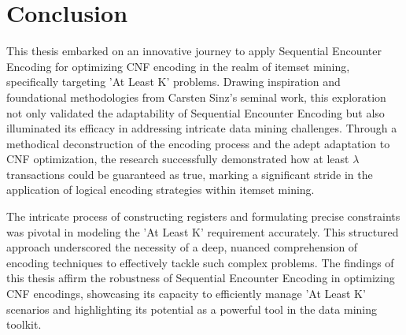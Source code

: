 \section{Conclusion}
This thesis embarked on an innovative journey to apply Sequential Encounter Encoding for optimizing CNF encoding in the realm of itemset mining, specifically targeting 'At Least K' problems. Drawing inspiration and foundational methodologies from Carsten Sinz's seminal work, this exploration not only validated the adaptability of Sequential Encounter Encoding but also illuminated its efficacy in addressing intricate data mining challenges. Through a methodical deconstruction of the encoding process and the adept adaptation to CNF optimization, the research successfully demonstrated how at least
$\lambda$ transactions could be guaranteed as true, marking a significant stride in the application of logical encoding strategies within itemset mining.

The intricate process of constructing registers and formulating precise constraints was pivotal in modeling the 'At Least K' requirement accurately. This structured approach underscored the necessity of a deep, nuanced comprehension of encoding techniques to effectively tackle such complex problems. The findings of this thesis affirm the robustness of Sequential Encounter Encoding in optimizing CNF encodings, showcasing its capacity to efficiently manage 'At Least K' scenarios and highlighting its potential as a powerful tool in the data mining toolkit.
